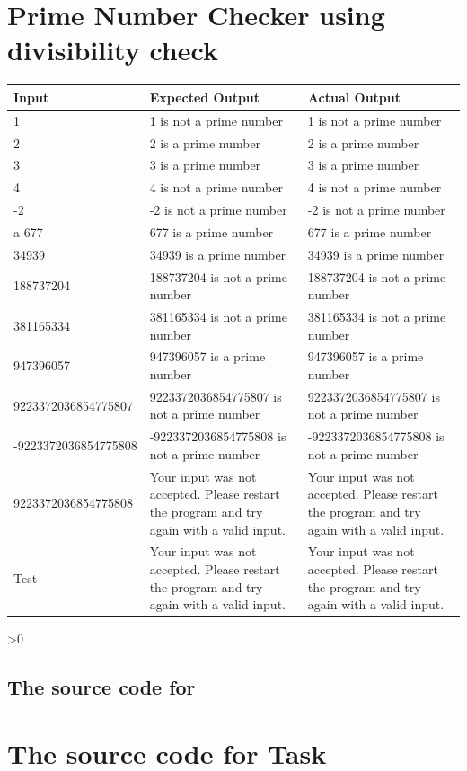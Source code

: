 \documentclass[12pt,a4paper,onesided]{report}
\newcommand{\source}{\pagebreak
	\ifnum\value{section}>0
		\subsection{The source code for \thesection}

	\else
		\section{The source code for Task \thechapter}

	\fi
	}
\begin{document}
\section{Prime Number Checker using divisibility check}
\begin{table}[h!]
	\centering
\begin{tabular}{lp{30ex}p{30ex}}
	\toprule Input & Expected Output & Actual Output\\
	\midrule
	1 & 1 is not a prime number& 1 is not a prime number\\
	2 & 2 is a prime number & 2 is a prime number\\
	3 & 3 is a prime number & 3 is a prime number\\
	4 & 4 is not a prime number & 4 is not a prime number\\
	-2 & -2 is not a prime number & -2 is not a prime number\\a
	677 & 677 is a prime number & 677 is a prime number\\
	34939 & 34939 is a prime number & 34939 is a prime number\\
	188737204 & 188737204 is not a prime number & 188737204 is not a prime number\\
	381165334 & 381165334 is not a prime number & 381165334 is not a prime number\\
	947396057 & 947396057 is a prime number & 947396057 is a prime number\\
	9223372036854775807 & 9223372036854775807 is not a prime number & 9223372036854775807 is not a prime number\\
	-9223372036854775808 & -9223372036854775808 is not a prime number &-9223372036854775808 is not a prime number\\
	9223372036854775808 & Your input was not accepted. Please restart the program and try again with a valid input. & Your input was not accepted. Please restart the program and try again with a valid input.\\
	Test & Your input was not accepted. Please restart the program and try again with a valid input. & Your input was not accepted. Please restart the program and try again with a valid input.\\
	
	\bottomrule
	\end{tabular}
\end{table}
\source

\newpage
\end{document}
